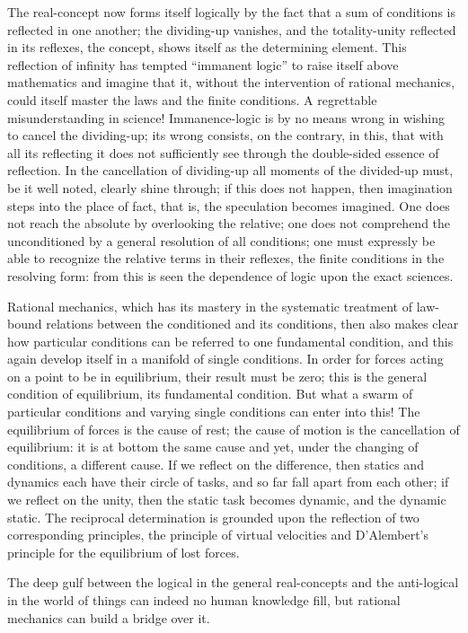 \documentclass[12pt]{book}
\begin{document}
The real-concept now forms itself logically by the fact that a sum of conditions is
reflected in one another; the dividing-up vanishes, and the totality-unity reflected
in its reflexes, the concept, shows itself as the determining element. This
reflection of infinity has tempted ``immanent logic'' to raise itself above
mathematics and imagine that it, without the intervention of rational mechanics,
could itself master the laws and the finite conditions. A regrettable
misunderstanding in science! Immanence-logic is by no means wrong in wishing to
cancel the dividing-up; its wrong consists, on the contrary, in this, that with all
its reflecting it does not sufficiently see through the double-sided essence of
reflection. In the cancellation of dividing-up all moments of the divided-up must,
be it well noted, clearly shine through; if this does not happen, then imagination
steps into the place of fact, that is, the speculation becomes imagined. One does
not reach the absolute by overlooking the relative; one does not comprehend the
unconditioned by a general resolution of all conditions; one must expressly be able
to recognize the relative terms in their reflexes, the finite conditions in the
resolving form: from this is seen the dependence of logic upon the exact sciences.

Rational mechanics, which has its mastery in the systematic treatment of law-bound
relations between the conditioned and its conditions, then also makes clear how
particular conditions can be referred to one fundamental condition, and this again
develop itself in a manifold of single conditions. In order for forces acting on a
point to be in equilibrium, their result must be zero; this is the general condition
of equilibrium, its fundamental condition. But what a swarm of particular conditions
and varying single conditions can enter into this! The equilibrium of forces is the
cause of rest; the cause of motion is the cancellation of equilibrium: it is at
bottom the same cause and yet, under the changing of conditions, a different cause.
If we reflect on the difference, then statics and dynamics each have their circle of
tasks, and so far fall apart from each other; if we reflect on the unity, then the
static task becomes dynamic, and the dynamic static. The reciprocal determination is
grounded upon the reflection of two corresponding principles, the principle of
virtual velocities and D'Alembert's principle for the equilibrium of lost forces.

The deep gulf between the logical in the general real-concepts and the anti-logical
in the world of things can indeed no human knowledge fill, but rational mechanics
can build a bridge over it.
\end{document}
